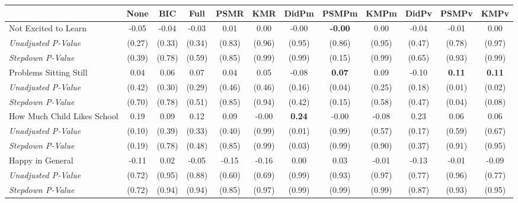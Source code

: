 \begin{tabular}{l c c c c c c c c c c c}
\toprule
 & None & BIC & Full & PSMR & KMR & DidPm & PSMPm & KMPm & DidPv & PSMPv & KMPv \\
\midrule
Not Excited to Learn & -0.05 & -0.04 & -0.03 & 0.01 & 0.00 & -0.00 & \textbf{ -0.00 } & 0.00 & -0.04 & -0.01 & 0.00 \\
\quad \textit{Unadjusted P-Value} & (0.27) & (0.33) & (0.34) & (0.83) & (0.96) & (0.95) & (0.86) & (0.95) & (0.47) & (0.78) & (0.97) \\
\quad \textit{Stepdown P-Value} & (0.39) & (0.78) & (0.59) & (0.85) & (0.99) & (0.99) & (0.15) & (0.99) & (0.65) & (0.93) & (0.99) \\
Problems Sitting Still & 0.04 & 0.06 & 0.07 & 0.04 & 0.05 & -0.08 & \textbf{ 0.07 } & 0.09 & -0.10 & \textbf{ 0.11 } & \textbf{ 0.11 } \\
\quad \textit{Unadjusted P-Value} & (0.42) & (0.30) & (0.29) & (0.46) & (0.46) & (0.16) & (0.04) & (0.25) & (0.18) & (0.01) & (0.02) \\
\quad \textit{Stepdown P-Value} & (0.70) & (0.78) & (0.51) & (0.85) & (0.94) & (0.42) & (0.15) & (0.58) & (0.47) & (0.04) & (0.08) \\
How Much Child Likes School & 0.19 & 0.09 & 0.12 & 0.09 & -0.00 & \textbf{ 0.24 } & -0.00 & -0.08 & 0.23 & 0.06 & 0.06 \\
\quad \textit{Unadjusted P-Value} & (0.10) & (0.39) & (0.33) & (0.40) & (0.99) & (0.01) & (0.99) & (0.57) & (0.17) & (0.59) & (0.67) \\
\quad \textit{Stepdown P-Value} & (0.19) & (0.78) & (0.48) & (0.85) & (0.99) & (0.03) & (0.99) & (0.90) & (0.37) & (0.91) & (0.95) \\
Happy in General & -0.11 & 0.02 & -0.05 & -0.15 & -0.16 & 0.00 & 0.03 & -0.01 & -0.13 & -0.01 & -0.09 \\
\quad \textit{Unadjusted P-Value} & (0.72) & (0.95) & (0.88) & (0.60) & (0.69) & (0.99) & (0.93) & (0.97) & (0.77) & (0.96) & (0.77) \\
\quad \textit{Stepdown P-Value} & (0.72) & (0.94) & (0.94) & (0.85) & (0.97) & (0.99) & (0.99) & (0.99) & (0.87) & (0.93) & (0.95) \\
\bottomrule
\end{tabular}
